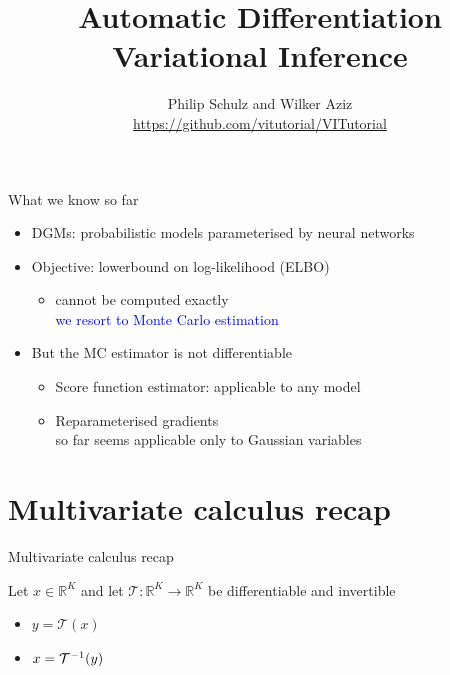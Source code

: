 \documentclass[14pt,dvipsnames]{beamer}
\title{Automatic Differentiation Variational Inference}
\author{Philip Schulz and Wilker Aziz\\
\url{https://github.com/vitutorial/VITutorial}}
\date{}
\begin{document}
\begin{frame}
\maketitle
\end{frame}



\begin{frame}{What we know so far}
    \begin{itemize}
        \item DGMs: \pause probabilistic models parameterised by neural networks \pause
        \item Objective: \pause lowerbound on log-likelihood (ELBO) \pause
        \begin{itemize}
        		\item \alert{cannot be computed exactly} \\ \pause
        		\textcolor{blue}{we resort to Monte Carlo estimation} \pause		
	\end{itemize}
	\item \alert{But the MC estimator is not differentiable} \pause		        
	\begin{itemize}
       		\item Score function estimator: applicable to any model  \pause
		\item Reparameterised gradients\\
		so far seems applicable only to Gaussian variables
        \end{itemize}
    \end{itemize}
    
\end{frame}

\frame{\tableofcontents}


\section{Multivariate calculus recap}

\begin{frame}{Multivariate calculus recap}

Let $x \in \mathbb R^K$ and let $\mathcal T: \mathbb R^K \to \mathbb R^K$ be differentiable and invertible
\begin{itemize}
	\item $y = \mathcal T(x)$
	\item $x = {\mathcal T}^{-1}(y)$
\end{itemize}

\end{frame}
\end{document}

